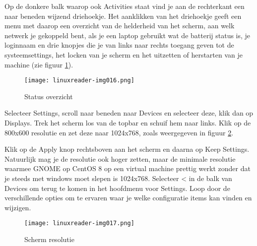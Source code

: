 Op de donkere balk waarop ook Activities staat vind je aan de rechterkant een naar beneden wijzend driehoekje. Het
aanklikken van het driehoekje geeft een menu met daarop een overzicht van de helderheid van het scherm, aan welk
netwerk je gekoppeld bent, als je een laptop gebruikt wat de batterij status is, je loginnaam en drie knopjes die je
van links naar rechts toegang geven tot de systeemsettings, het locken van je scherm en het uitzetten of herstarten van
je machine (zie figuur \ref{fig:de_status}).



\begin{figure}[H]
\texttt{[image: linuxreader-img016.png]}
	\caption{Status overzicht}
	\label{fig:de_status}
\end{figure}
Selecteer Settings, scroll naar beneden naar Devices en selecteer deze, klik dan op Displays. Trek het scherm los van
de topbar en schuif hem naar links. Klik op de 800x600 resolutie en zet deze naar 1024x768, zoals weergegeven in figuur \ref{fig:de_resolutie}.

Klik op de Apply knop rechtsboven aan het scherm en daarna op Keep Settings. Natuurlijk mag je
de resolutie ook hoger zetten, maar de minimale resolutie waarmee GNOME op CentOS 8 op een virtual machine prettig werkt
zonder dat je steeds met windows moet slepen is 1024x768. Selecteer {\textless} in de balk van Devices om terug te
komen in het hoofdmenu voor Settings. Loop door de verschillende opties om te ervaren waar je welke configuratie items
kan vinden en wijzigen.

\begin{figure}[H]
\texttt{[image: linuxreader-img017.png]}
	\caption{Scherm resolutie}
	\label{fig:de_resolutie}
\end{figure}

